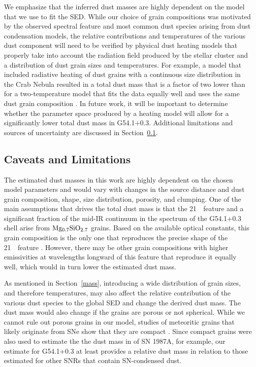 \documentclass{emulateapj}
\begin{document}
We emphasize that the inferred dust masses are highly dependent on the model that we use to fit the SED. While our choice of grain compositions was motivated by the observed spectral feature and most common dust species arising from dust condensation models, the relative contributions and temperatures of the various dust component will need to be verified by physical dust heating models that properly take into account the radiation field produced by the stellar cluster and a distribution of dust grain sizes and temperatures. For example, a model that included radiative heating of dust grains with a continuous size distribution in the Crab Nebula resulted in a total dust mass that is a factor of two lower than for a two-temperature model that fits the data equally well and uses the same dust grain composition \citep{temim13}. In future work, it will be important to determine whether the parameter space produced by a heating model will allow for a significantly lower total dust mass in G54.1+0.3. Additional limitations and sources of uncertainty are discussed in Section~\ref{caveats}.

\subsection{Caveats and Limitations}\label{caveats}

The estimated dust masses in this work are highly dependent on the chosen model parameters and would vary with changes in the source distance and dust grain composition, shape, size distribution, porosity, and clumping. One of the main assumptions that drives the total dust mass is that the 21~\micron\ feature and a significant fraction of the mid-IR continuum in the spectrum of the G54.1+0.3 shell arise from $\rm Mg_{0.7}SiO_{2.7}$ grains. Based on the available optical constants, this grain composition is the only one that reproduces the precise shape of the 21~\micron\ feature \citep[see][]{arendt14}. However, there may be other grain compositions with higher emissivities at wavelengths longward of this feature that reproduce it equally well, which would in turn lower the estimated dust mass.

As mentioned in Section~\ref{mass}, introducing a wide distribution of grain sizes, and therefore temperatures, may also affect the relative contribution of the various dust species to the global SED and change the derived dust mass. The dust mass would also change if the grains are porous or not spherical. While we cannot rule out porous grains in our model, studies of meteoritic grains that likely originate from SNe show that they are compact \citep{molster10}. Since compact grains were also used to estimate the the dust mass in of SN 1987A, for example, our estimate for G54.1+0.3 at least provides a relative dust mass in relation to those estimated for other SNRs that contain SN-condensed dust.
\end{document}
